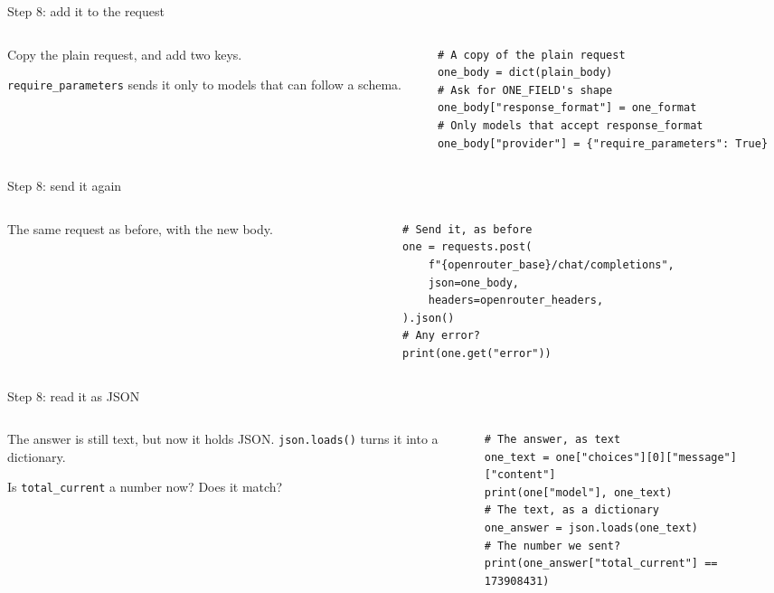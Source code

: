 \documentclass[9pt,aspectratio=169]{beamer}
\begin{document}
\begin{frame}[fragile]{Step 8: add it to the request}
    \begin{columns}[T]
        \begin{column}{0.37\textwidth}
            Copy the plain request, and add two keys.

            \medskip
            \texttt{require\_parameters} sends it only to models that can follow a schema.
        \end{column}
        \begin{column}{0.6\textwidth}
\begin{lstlisting}
# A copy of the plain request
one_body = dict(plain_body)
# Ask for ONE_FIELD's shape
one_body["response_format"] = one_format
# Only models that accept response_format
one_body["provider"] = {"require_parameters": True}
\end{lstlisting}
        \end{column}
    \end{columns}
\end{frame}

\begin{frame}[fragile]{Step 8: send it again}
    \begin{columns}[T]
        \begin{column}{0.37\textwidth}
            The same request as before, with the new body.
        \end{column}
        \begin{column}{0.6\textwidth}
\begin{lstlisting}
# Send it, as before
one = requests.post(
    f"{openrouter_base}/chat/completions",
    json=one_body,
    headers=openrouter_headers,
).json()
# Any error?
print(one.get("error"))
\end{lstlisting}
        \end{column}
    \end{columns}
\end{frame}

\begin{frame}[fragile]{Step 8: read it as JSON}
    \begin{columns}[T]
        \begin{column}{0.37\textwidth}
            The answer is still text, but now it holds JSON. \texttt{json.loads()} turns it into a dictionary.

            \medskip
            Is \texttt{total\_current} a number now? Does it match?
        \end{column}
        \begin{column}{0.6\textwidth}
\begin{lstlisting}
# The answer, as text
one_text = one["choices"][0]["message"]["content"]
print(one["model"], one_text)
# The text, as a dictionary
one_answer = json.loads(one_text)
# The number we sent?
print(one_answer["total_current"] == 173908431)
\end{lstlisting}
        \end{column}
    \end{columns}
\end{frame}
\end{document}
